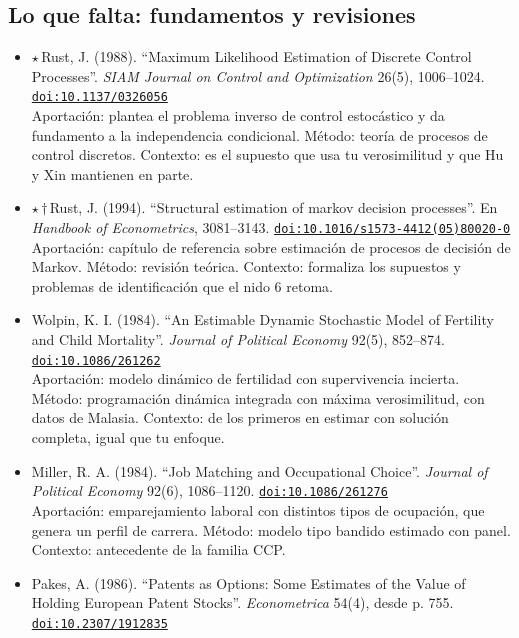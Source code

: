 \documentclass[11pt]{article}
\begin{document}
\subsection*{Lo que falta: fundamentos y revisiones}
\begin{itemize}
\item $\star$\,Rust, J. (1988). ``Maximum Likelihood Estimation of Discrete Control Processes''. \textit{SIAM Journal on Control and Optimization} 26(5), 1006--1024. \href{https://doi.org/10.1137/0326056}{\texttt{doi:10.1137/0326056}}\\
Aportación: plantea el problema inverso de control estocástico y da fundamento a la independencia condicional. Método: teoría de procesos de control discretos. Contexto: es el supuesto que usa tu verosimilitud y que Hu y Xin mantienen en parte.
\item $\star$\,$\dagger$\,Rust, J. (1994). ``Structural estimation of markov decision processes''. En \textit{Handbook of Econometrics}, 3081--3143. \href{https://doi.org/10.1016/s1573-4412(05)80020-0}{\texttt{doi:10.1016/s1573-4412(05)80020-0}}\\
Aportación: capítulo de referencia sobre estimación de procesos de decisión de Markov. Método: revisión teórica. Contexto: formaliza los supuestos y problemas de identificación que el nido 6 retoma.
\item Wolpin, K. I. (1984). ``An Estimable Dynamic Stochastic Model of Fertility and Child Mortality''. \textit{Journal of Political Economy} 92(5), 852--874. \href{https://doi.org/10.1086/261262}{\texttt{doi:10.1086/261262}}\\
Aportación: modelo dinámico de fertilidad con supervivencia incierta. Método: programación dinámica integrada con máxima verosimilitud, con datos de Malasia. Contexto: de los primeros en estimar con solución completa, igual que tu enfoque.
\item Miller, R. A. (1984). ``Job Matching and Occupational Choice''. \textit{Journal of Political Economy} 92(6), 1086--1120. \href{https://doi.org/10.1086/261276}{\texttt{doi:10.1086/261276}}\\
Aportación: emparejamiento laboral con distintos tipos de ocupación, que genera un perfil de carrera. Método: modelo tipo bandido estimado con panel. Contexto: antecedente de la familia CCP.
\item Pakes, A. (1986). ``Patents as Options: Some Estimates of the Value of Holding European Patent Stocks''. \textit{Econometrica} 54(4), desde p. 755. \href{https://doi.org/10.2307/1912835}{\texttt{doi:10.2307/1912835}}\\

\end{itemize}
\end{document}
